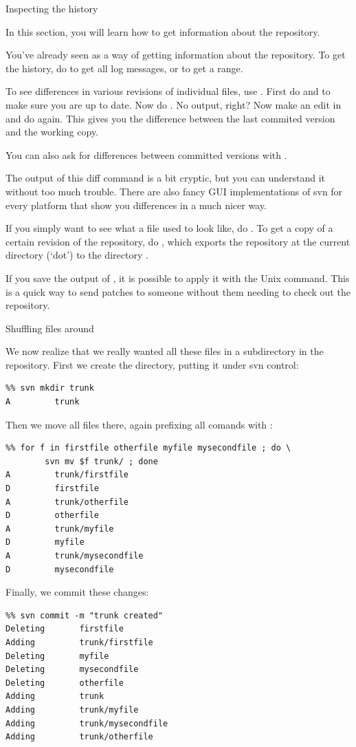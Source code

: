  {Inspecting the history}

\begin{purpose}
  In this section, you will learn how to get information about the repository.
\end{purpose}

You've already seen  as a way of getting information
about the repository. To get the history, do  to get all
log messages, or  to get a range.

To see differences in various revisions of individual files, use
. First do  and  to
make sure you are up to date. Now do . No
output, right? Now make an edit in  and do  again. This gives you the difference between the last
commited version and the working copy.

You can also ask for differences between committed versions with
.

The output of this diff command is a bit cryptic, but you can
understand it without too much trouble. There are also fancy GUI
implementations of svn for every platform that show you differences in
a much nicer way.

If you simply want to see what a file used to look like, do . To get a copy of a certain revision of the
repository, do , which exports the
repository at the current directory (`dot') to the directory .

If you save the output of , it is possible to apply it
with the Unix  command. This is a quick way to send patches
to someone without them needing to check out the repository.

 {Shuffling files around}

We now realize that we really wanted all these files in a subdirectory
in the repository. First we create the directory, putting it under svn control:
\begin{verbatim}
%% svn mkdir trunk
A         trunk
\end{verbatim}
Then we move all files there, again prefixing all comands with :
\begin{verbatim}
%% for f in firstfile otherfile myfile mysecondfile ; do \
        svn mv $f trunk/ ; done
A         trunk/firstfile
D         firstfile
A         trunk/otherfile
D         otherfile
A         trunk/myfile
D         myfile
A         trunk/mysecondfile
D         mysecondfile
\end{verbatim}
Finally, we commit these changes:
\begin{verbatim}
%% svn commit -m "trunk created"
Deleting       firstfile
Adding         trunk/firstfile
Deleting       myfile
Deleting       mysecondfile
Deleting       otherfile
Adding         trunk
Adding         trunk/myfile
Adding         trunk/mysecondfile
Adding         trunk/otherfile
\end{verbatim}


